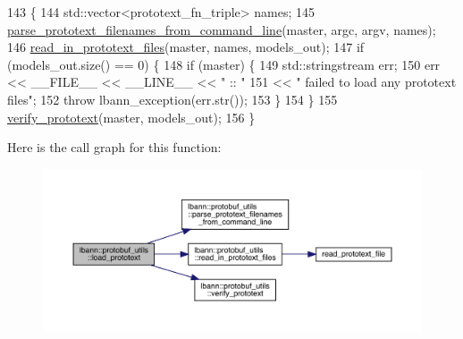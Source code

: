 \begin{DoxyCode}
143                                                             \{
144     std::vector<prototext\_fn\_triple> names;
145     \hyperlink{classlbann_1_1protobuf__utils_a690c56a9ac8bcbc883751355b53e0006}{parse\_prototext\_filenames\_from\_command\_line}(master, argc, 
      argv, names);
146     \hyperlink{classlbann_1_1protobuf__utils_ab8470c35e353af71b04e1e853b99f8ae}{read\_in\_prototext\_files}(master, names, models\_out);
147     \textcolor{keywordflow}{if} (models\_out.size() == 0) \{
148       \textcolor{keywordflow}{if} (master) \{
149         std::stringstream err;
150         err << \_\_FILE\_\_ << \_\_LINE\_\_ << \textcolor{stringliteral}{" :: "}
151             << \textcolor{stringliteral}{" failed to load any prototext files"};
152         \textcolor{keywordflow}{throw} lbann\_exception(err.str());    
153       \}
154     \}
155     \hyperlink{classlbann_1_1protobuf__utils_a058d524e15fb811e0d193ffb308c5faf}{verify\_prototext}(master, models\_out);
156 \}
\end{DoxyCode}
Here is the call graph for this function\+:\nopagebreak
\begin{figure}[H]
\begin{center}
\leavevmode
\includegraphics[width=350pt]{classlbann_1_1protobuf__utils_ad85c0f279c98fad3f9e9e6c54786acf1_cgraph}
\end{center}
\end{figure}
\mbox{\label{classlbann_1_1protobuf__utils_a690c56a9ac8bcbc883751355b53e0006}} 
